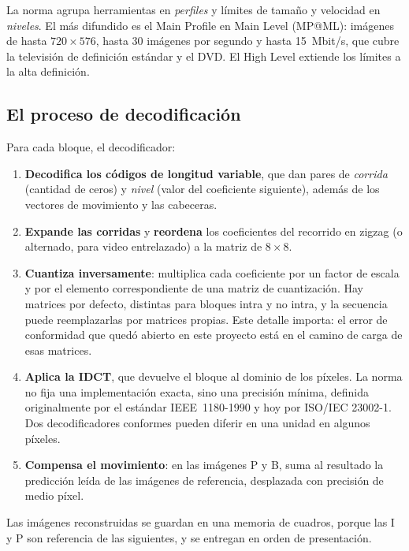 La norma agrupa herramientas en \emph{perfiles} y límites de tamaño y
velocidad en \emph{niveles}. El más difundido es el Main Profile en Main
Level (MP@ML): imágenes de hasta $720 \times 576$, hasta 30 imágenes por
segundo y hasta 15~Mbit/s, que cubre la televisión de definición estándar y
el DVD. El High Level extiende los límites a la alta definición.

\subsection{El proceso de decodificación}
\label{sec:proceso-decodificacion}

Para cada bloque, el decodificador:

\begin{enumerate}
  \item \textbf{Decodifica los códigos de longitud variable}, que dan pares
    de \emph{corrida} (cantidad de ceros) y \emph{nivel} (valor del
    coeficiente siguiente), además de los vectores de movimiento y las
    cabeceras.
  \item \textbf{Expande las corridas} y \textbf{reordena} los coeficientes
    del recorrido en zigzag (o alternado, para video entrelazado) a la
    matriz de $8 \times 8$.
  \item \textbf{Cuantiza inversamente}: multiplica cada coeficiente por un
    factor de escala y por el elemento correspondiente de una matriz de
    cuantización. Hay matrices por defecto, distintas para bloques intra y
    no intra, y la secuencia puede reemplazarlas por matrices propias. Este
    detalle importa: el error de conformidad que quedó abierto en este
    proyecto está en el camino de carga de esas matrices.
  \item \textbf{Aplica la IDCT}, que devuelve el bloque al dominio de los
    píxeles. La norma no fija una implementación exacta, sino una precisión
    mínima, definida originalmente por el estándar IEEE~1180-1990
    \citep{IEEE_1180_1990} y hoy por ISO/IEC 23002-1. Dos decodificadores
    conformes pueden diferir en una unidad en algunos píxeles.
  \item \textbf{Compensa el movimiento}: en las imágenes P y B, suma al
    resultado la predicción leída de las imágenes de referencia, desplazada
    con precisión de medio píxel.
\end{enumerate}

Las imágenes reconstruidas se guardan en una memoria de cuadros, porque las
I y P son referencia de las siguientes, y se entregan en orden de
presentación.

